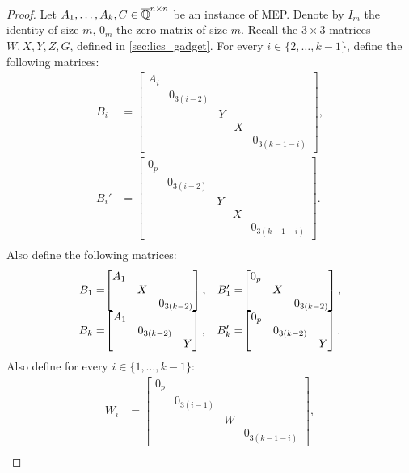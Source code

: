 \begin{proof}
Let $A_1,\ldots,A_k,C\in\overline{\mathbb{Q}}^{n\times n}$ be an instance of MEP\@. Denote by $I_m$ the identity of size $m$,
$0_m$ the zero matrix of size $m$. Recall the $3 \times 3$ matrices $W,X,Y,Z,G$, defined in \cref{sec:lics_gadget}.
For every $i\in\lbrace 2,\ldots,k-1\rbrace$, define the following matrices:
\begin{align*}
B_{i}&=\begin{bmatrix}A_{i}&&&&\\&0_{3(i-2)}&&&\\&&Y&&\\&&&X&\\&&&&0_{3(k-1-i)}\end{bmatrix},\\
B_{i}'&=\begin{bmatrix}0_p&&&&\\&0_{3(i-2)}&&&\\&&Y&&\\&&&X&\\&&&&0_{3(k-1-i)}\end{bmatrix}.\\
\end{align*}
Also define the following matrices:
\[
\begin{array}{r@{}c@{}cr@{}c}
B_1=&\begin{bmatrix}A_1&&\\&X&\\&&0_{3(k-2)}\end{bmatrix},&&
B_1'=&\begin{bmatrix}0_p&&\\&X&\\&&0_{3(k-2)}\end{bmatrix},\\
B_k=&\begin{bmatrix}A_1&&\\&0_{3(k-2)}&\\&&Y\end{bmatrix},&&
B_k'=&\begin{bmatrix}0_p&&\\&0_{3(k-2)}&\\&&Y\end{bmatrix}.\\
\end{array}\]
Also define for every $i\in\lbrace 1,\ldots,k-1\rbrace$:
\begin{align*}
W_{i}&=\begin{bmatrix}0_p&&&\\&0_{3(i-1)}&&\\&&W&\\&&&0_{3(k-1-i)}\end{bmatrix},\\

\end{align*}
\end{proof}

